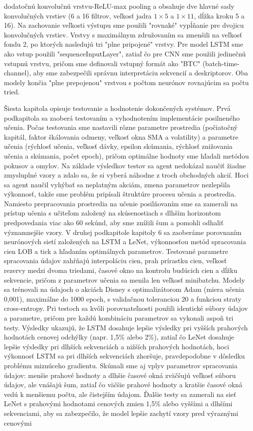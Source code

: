 \documentclass[a4paper,oneside,onecolumn,12pt]{book}
\begin{document}
dodatočnú konvolučnú vrstvu-ReLU-max pooling a obsahuje dve hlavné sady konvolučných vrstiev (6 a 16 filtrov, veľkosť jadra $1\times5$ a $1\times11$, dĺžka kroku 5 a 16). Na zachovanie veľkosti výstupu sme použili "rovnaké" vypĺňanie pre dvojicu konvolučných vrstiev. Vrstvy s maximálnym združovaním sa zmenšili na veľkosť fondu 2, po ktorých nasledujú tri "plne pripojené" vrstvy. Pre model LSTM sme ako vstup použili "sequenceInputLayer", zatiaľ čo pre CNN sme použili jedinečnú vstupnú vrstvu, pričom sme definovali vstupný formát ako "BTC" (batch-time-channel), aby sme zabezpečili správnu interpretáciu sekvencií a deskriptorov. Oba modely končia "plne prepojenou" vrstvou s počtom neurónov rovnajúcim sa počtu tried.

Šiesta kapitola opisuje testovanie a hodnotenie dokončených systémov. Prvá podkapitola sa zaoberá testovaním a vyhodnotením implementácie posilneného učenia. Počas testovania sme nastavili rôzne parametre prostredia (počiatočný kapitál, faktor škálovania odmeny, veľkosť okna SMA a volatility) a parametre učenia (rýchlosť učenia, veľkosť dávky, epsilon skúmania, rýchlosť znižovania učenia a skúmania, počet epoch), pričom optimálne hodnoty sme hľadali metódou pokusov a omylov. Na základe výsledkov testov sa agent nedokázal naučiť žiadne zmysluplné vzory a zdalo sa, že si vyberá náhodne z troch obchodných akcií. Hoci sa agent naučil vyhýbať sa neplatným akciám, zmena parametrov nezlepšila výkonnosť, takže sme problém pripísali štruktúre procesu učenia a prostredia. Namiesto prepracovania prostredia na učenie posilňovaním sme sa zamerali na prístup učenia s učiteľom založený na skúsenostiach s dlhším horizontom predpovedania viac ako 60 sekúnd, aby sme znížili šum a pomohli odhaliť významnejšie vzory. V druhej podkapitole kapitoly 6 sa zaoberáme porovnaním neurónových sietí založených na LSTM a LeNet, výkonnosťou metód spracovania cien LOB a tick a hľadaním optimálnych parametrov. Testované parametre spracovania údajov zahŕňajú interpoláciu cien, prah prírastku cien, veľkosť rezervy medzi dvoma triedami, časové okno na kontrolu budúcich cien a dĺžku sekvencie, pričom z parametrov učenia sa menila len veľkosť minibatchu. Modely sa trénovali na údajoch o akciách Disney s optimalizátorom Adam (miera učenia 0,001), maximálne do 1000 epoch, s validačnou toleranciou 20 a funkciou straty cross-entropy. Pri testoch sa kvôli porovnateľnosti použili identické súbory údajov a parametre, pričom pre každú kombináciu parametrov sa vykonali aspoň tri testy. Výsledky ukazujú, že LSTM dosahuje lepšie výsledky pri vyšších prahových hodnotách cenovej odchýlky (napr. 1,5\% alebo 2\%), zatiaľ čo LeNet dosahuje lepšie výsledky pri dlhších sekvenciách a nižších prahových hodnotách, hoci výkonnosť LSTM sa pri dlhších sekvenciách zhoršuje, pravdepodobne v dôsledku problému miznúceho gradientu. Skúmali sme aj vplyv parametrov spracovania údajov: menšie prahové hodnoty a dlhšie časové okná zväčšujú veľkosť súboru údajov, ale vnášajú šum, zatiaľ čo väčšie prahové hodnoty a kratšie časové okná vedú k menšiemu počtu, ale čistejším údajom. Ďalšie testy sa zamerali na sieť LeNet s prahovými hodnotami cenových zmien 1,5\% alebo vyššími a dlhšími sekvenciami, aby sa zabezpečilo, že model lepšie zachytí vzory pred výraznými cenovými 
\end{document}
